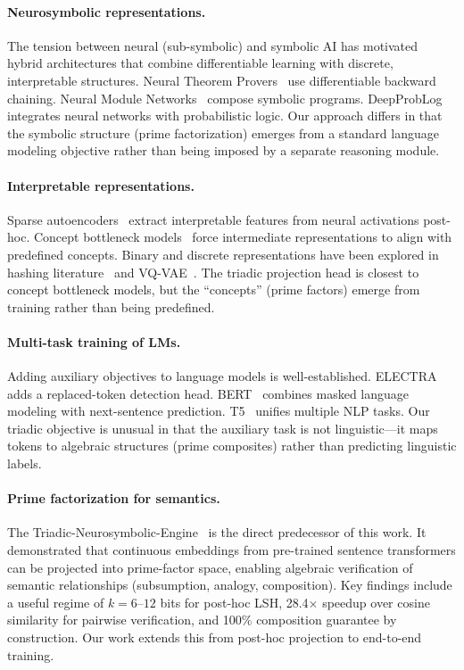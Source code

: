 \documentclass[11pt,a4paper]{article}
\begin{document}
\paragraph{Neurosymbolic representations.}
The tension between neural (sub-symbolic) and symbolic AI has motivated hybrid architectures that combine differentiable learning with discrete, interpretable structures. Neural Theorem Provers~\citep{rocktaschel2017ntp} use differentiable backward chaining. Neural Module Networks~\citep{andreas2016nmn} compose symbolic programs. DeepProbLog~\citep{manhaeve2018deepproblog} integrates neural networks with probabilistic logic. Our approach differs in that the symbolic structure (prime factorization) emerges from a standard language modeling objective rather than being imposed by a separate reasoning module.

\paragraph{Interpretable representations.}
Sparse autoencoders~\citep{cunningham2023sparse} extract interpretable features from neural activations post-hoc. Concept bottleneck models~\citep{koh2020concept} force intermediate representations to align with predefined concepts. Binary and discrete representations have been explored in hashing literature~\citep{wang2018survey} and VQ-VAE~\citep{vandenoord2017vqvae}. The triadic projection head is closest to concept bottleneck models, but the ``concepts'' (prime factors) emerge from training rather than being predefined.

\paragraph{Multi-task training of LMs.}
Adding auxiliary objectives to language models is well-established. ELECTRA~\citep{clark2020electra} adds a replaced-token detection head. BERT~\citep{devlin2019bert} combines masked language modeling with next-sentence prediction. T5~\citep{raffel2020t5} unifies multiple NLP tasks. Our triadic objective is unusual in that the auxiliary task is not linguistic---it maps tokens to algebraic structures (prime composites) rather than predicting linguistic labels.

\paragraph{Prime factorization for semantics.}
The Triadic-Neurosymbolic-Engine~\citep{ornelas2026prime} is the direct predecessor of this work. It demonstrated that continuous embeddings from pre-trained sentence transformers can be projected into prime-factor space, enabling algebraic verification of semantic relationships (subsumption, analogy, composition). Key findings include a useful regime of $k=6$--$12$ bits for post-hoc LSH, 28.4$\times$ speedup over cosine similarity for pairwise verification, and 100\% composition guarantee by construction. Our work extends this from post-hoc projection to end-to-end training.
\end{document}
